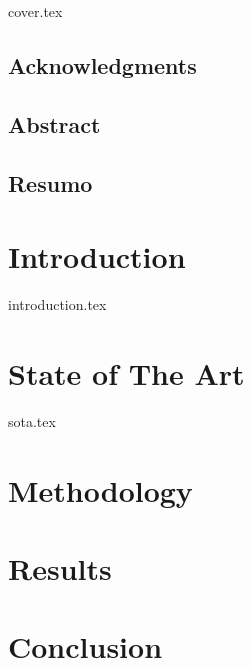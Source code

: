 \documentclass[a4paper, 12pt]{report}
\begin{document}
{cover.tex}
\newpage
\tableofcontents
\frontmatter
\section*{Acknowledgments}

\newpage
\section*{Abstract}

\newpage
\section*{Resumo}

\mainmatter


\newpage
\chapter{Introduction}
{introduction.tex}

\newpage
\chapter{State of The Art}
{sota.tex}

\newpage
\chapter{Methodology}

\newpage
\chapter{Results}

\newpage
\chapter{Conclusion}

\newpage
\printbibliography
\end{document}
